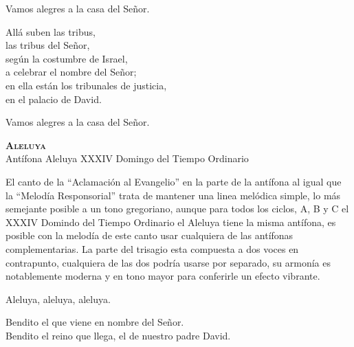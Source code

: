 \documentclass[12pt, letterpaper]{report}
\begin{document}
    \noindent
    Vamos alegres a la casa del Se\~nor.

    \noindent
    All\'a suben las tribus,\\
    las tribus del Se\~nor,\\
    seg\'un la costumbre de Israel,\\
    a celebrar el nombre del Se\~nor;\\
    en ella est\'an los tribunales de justicia,\\
    en el palacio de David.

    \noindent
    Vamos alegres a la casa del Se\~nor.
    \clearpage



    \begin{center}
        {\scshape \Huge {\bfseries Aleluya}}\\
        \LARGE Ant\'ifona Aleluya XXXIV Domingo del Tiempo Ordinario
    \end{center}

    \Large El canto de la ``Aclamaci\'on al Evangelio'' en la parte de la ant\'ifona al igual que la ``Melod\'ia Responsorial''
    trata de mantener una linea mel\'odica simple, lo m\'as semejante posible a un tono gregoriano, aunque para todos los ciclos,
    A, B y C el XXXIV Domindo del Tiempo Ordinario el Aleluya tiene la misma ant\'ifona, es posible con la melod\'ia de este
    canto usar cualquiera de las ant\'ifonas complementarias. La parte del trisagio esta compuesta a dos voces en contrapunto,
    cualquiera de las dos podr\'ia usarse por separado, su armon\'ia es notablemente moderna y en tono mayor para conferirle
    un efecto vibrante.

    \noindent
    \LARGE Aleluya, aleluya, aleluya.

    \noindent
    Bendito el que viene en nombre del Se\~nor.\\
    Bendito el reino que llega, el de nuestro padre David.
\end{document}
